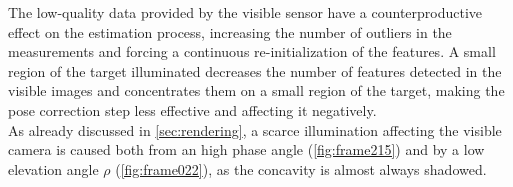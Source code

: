 The low-quality data provided by the visible sensor have a counterproductive effect on the estimation process, increasing the number of outliers in the measurements and forcing a continuous re-initialization of the features. A small region of the target illuminated decreases the number of features detected in the visible images and concentrates them on a small region of the target, making the pose correction step less effective and affecting it negatively.\\
As already discussed in \cref{sec:rendering}, a scarce illumination affecting the visible camera is caused both from an high phase angle (\cref{fig:frame215}) and by a low elevation angle $\rho$  (\cref{fig:frame022}), as the concavity is almost always shadowed.\\

